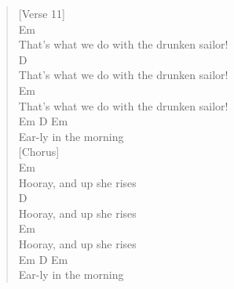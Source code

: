 \documentclass[11pt]{article}
\begin{document}
\begin{verse}
[Verse 11]\\
Em\\
That's what we do with the drunken sailor!\\
D\\
That's what we do with the drunken sailor!\\
Em\\
That's what we do with the drunken sailor!\\
Em  D         Em\\
Ear-ly in the morning\\
\vspace*{1em}
\vspace*{1em}
[Chorus]\\
Em\\
Hooray, and up she rises\\
D\\
Hooray, and up she rises\\
Em\\
Hooray, and up she rises\\
Em  D         Em\\
Ear-ly in the morning\\
\end{verse}
\clearpage
\end{document}

